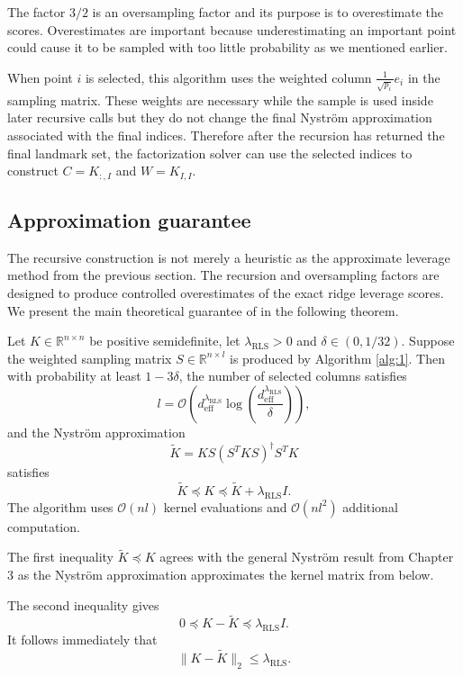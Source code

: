 The factor $3/2$ is an oversampling factor and its purpose is to overestimate the scores. Overestimates are important because underestimating an important point could cause it to be sampled with too little probability as we mentioned earlier.

When point $i$ is selected, this algorithm uses the weighted column $\frac{1}{\sqrt{p_i}}e_i$ in the sampling matrix. These weights are necessary while the sample is used inside later recursive calls but they do not change the final Nystr\"om approximation associated with the final indices. Therefore after the recursion has returned the final landmark set, the factorization solver can use the selected indices to construct $C=K_{:,I}$ and $W=K_{I,I}.$

\subsection{Approximation guarantee}

The recursive construction is not merely a heuristic as the approximate leverage method from the previous section. The recursion and oversampling factors are designed to produce controlled overestimates of the exact ridge leverage scores. We present the main theoretical guarantee of \citet{musco2017recursive} in the following theorem.

\begin{theorem}
Let $K\in\mathbb{R}^{n\times n}$ be positive semidefinite, let $\lambda_{\mathrm{RLS}}>0$  and $\delta\in(0,1/32)$. Suppose the weighted sampling matrix $S\in\mathbb{R}^{n\times l}$ is produced by Algorithm \ref{alg:1}. Then with probability at least $1-3\delta$, the number of selected columns satisfies
\[
l = \mathcal{O}\left(d_{\mathrm{eff}}^{\lambda_{\mathrm{RLS}}}\log\left(\frac{d_{\mathrm{eff}}^{\lambda_{\mathrm{RLS}}}}{\delta}\right)\right),
\]
and the Nystr\"om approximation
\[
\widetilde K = KS(S^TKS)^\dagger S^TK
\]
satisfies
\[
\widetilde K \preceq K \preceq \widetilde K+\lambda_{\mathrm{RLS}}I.
\]
The algorithm uses $\mathcal{O}(nl)$ kernel evaluations and $\mathcal{O}(nl^2)$ additional computation.
\end{theorem}

The first inequality $\widetilde K\preceq K$ agrees with the general Nystr\"om result from Chapter 3 as the Nystr\"om approximation approximates the kernel matrix from below.

The second inequality gives
\[
0 \preceq K-\widetilde K \preceq \lambda_{\mathrm{RLS}}I.
\]
It follows immediately that
\[
\|K-\widetilde K\|_2 \leq \lambda_{\mathrm{RLS}}.
\]

